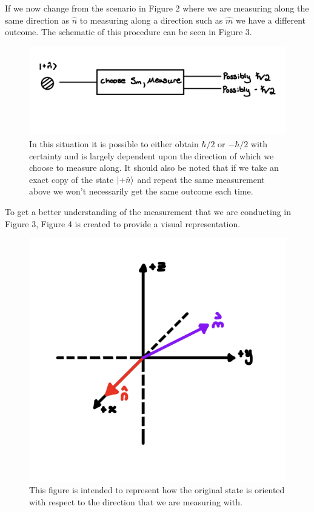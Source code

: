 \documentclass[twocolumn]{article}
\begin{document}
\newline
If we now change from the scenario in Figure 2 where we are measuring along the same direction as $\hat{n}$ to measuring along a direction such as $\hat{m}$ we have a different outcome. The schematic of this procedure can be seen in Figure 3.
\begin{figure}[htbp]
\begin{center}
\includegraphics[width=1.00\linewidth]{Spin-With-M-Direction.jpg}
\caption{In this situation it is possible to either obtain $\hbar/2$ or $-\hbar/2$ with certainty and is largely dependent upon the direction of which we choose to measure along. It should also be noted that if we take an exact copy of the state $\ket{+\hat{n}}$ and repeat the same measurement above we won't necessarily get the same outcome each time.}
\end{center}
\end{figure}
\newpage
To get a better understanding of the measurement that we are conducting in Figure 3, Figure 4 is created to provide a visual representation.
\begin{figure}[htbp]
\begin{center}
\includegraphics[width=0.75\linewidth]{Spin-With-M-and-N-Graph.jpg}
\caption{This figure is intended to represent how the original state is oriented with respect to the direction that we are measuring with.}
\end{center}
\end{figure}
\end{document}

